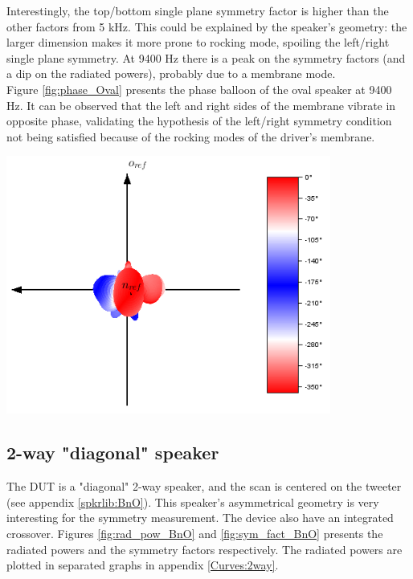 \documentclass{report}
\begin{document}
\begin{minipage}{0.5\textwidth}
Interestingly, the top/bottom single plane symmetry factor is higher than the other factors from 5 kHz. This could be explained by the speaker's geometry: the larger dimension makes it more prone to rocking mode, spoiling the left/right single plane symmetry. At 9400 Hz there is a peak on the symmetry factors (and a dip on the radiated powers), probably due to a membrane mode.\\

Figure \ref{fig:phase_Oval} presents the phase balloon of the oval speaker at 9400 Hz. It can be observed that the left and right sides of the membrane vibrate in opposite phase, validating the hypothesis of the left/right symmetry condition not being satisfied because of the rocking modes of the driver's membrane. 
\end{minipage}
\begin{minipage}{0.5\textwidth}
\begin{center}
	\includegraphics[width=0.8\textwidth]{Sym/phase_oval} 
    \captionsetup{hypcap=false} 
	\label{fig:phase_Oval}
\end{center}
\end{minipage}

\newpage

\subsection{2-way "diagonal" speaker}

The DUT is a "diagonal" 2-way speaker, and the scan is centered on the tweeter (see appendix \ref{spkrlib:BnO}). This speaker's asymmetrical geometry is very interesting for the symmetry measurement. The device also have an integrated crossover. Figures \ref{fig:rad_pow_BnO} and \ref{fig:sym_fact_BnO} presents the radiated powers and the symmetry factors respectively. The radiated powers are plotted in separated graphs in appendix \ref{Curves:2way}. \\
\end{document}
